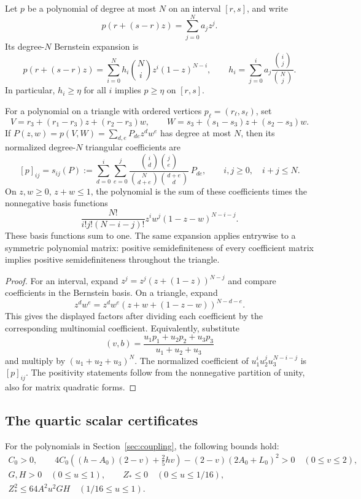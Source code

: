 \begin{lemma}\label{lem:bernstein-conversion}
Let $p$ be a polynomial of degree at most $N$ on an interval $[r,s]$,
and write
\[
 p(r+(s-r)z)=\sum_{j=0}^N a_jz^j.
\]
Its degree-$N$ Bernstein expansion is
\[
 p(r+(s-r)z)=\sum_{i=0}^N h_i\binom Ni z^i(1-z)^{N-i},
 \qquad
 h_i=\sum_{j=0}^i a_j\frac{\binom ij}{\binom Nj}.
\]
In particular, $h_i\ge\eta$ for all $i$ implies $p\ge\eta$ on
$[r,s]$.

For a polynomial on a triangle with ordered vertices
$p_\ell=(r_\ell,s_\ell)$, set
\[
 V=r_3+(r_1-r_3)z+(r_2-r_3)w,\qquad
 W=s_3+(s_1-s_3)z+(s_2-s_3)w.
\]
If $P(z,w)=p(V,W)=\sum_{d,e}P_{de}z^dw^e$ has degree at most $N$,
then its normalized degree-$N$ triangular coefficients are
\[
 [p]_{ij}=s_{ij}(P):=
 \sum_{d=0}^i\sum_{e=0}^j
 \frac{\binom id\binom je}
      {\binom N{d+e}\binom{d+e}d}\,P_{de},
 \qquad i,j\ge0,\quad i+j\le N.
\]
On $z,w\ge0$, $z+w\le1$, the polynomial is the sum of these coefficients
times the nonnegative basis functions
\[
 \frac{N!}{i!j!(N-i-j)!}
       z^iw^j(1-z-w)^{N-i-j}.
\]
These basis functions sum to one. The same expansion applies entrywise
to a symmetric polynomial matrix: positive semidefiniteness of every
coefficient matrix implies positive semidefiniteness throughout the
triangle.
\end{lemma}

\begin{proof}
For an interval, expand
$z^j=z^j(z+(1-z))^{N-j}$ and compare coefficients in the Bernstein
basis. On a triangle, expand
\[
 z^dw^e=z^dw^e(z+w+(1-z-w))^{N-d-e}.
\]
This gives the displayed factors after dividing each coefficient by the
corresponding multinomial coefficient. Equivalently, substitute
\[
 (v,b)=\frac{u_1p_1+u_2p_2+u_3p_3}{u_1+u_2+u_3}
\]
and multiply by $(u_1+u_2+u_3)^N$. The normalized coefficient of
$u_1^iu_2^ju_3^{N-i-j}$ is $[p]_{ij}$. The positivity statements
follow from the nonnegative partition of unity, also for matrix
quadratic forms.
\end{proof}

\subsection{The quartic scalar certificates}

\begin{lemma}\label{lem:scalar-certificates}
For the polynomials in Section~\ref{sec:coupling}, the following bounds
hold:
\[
\begin{gathered}
 C_0>0,\qquad
 4C_0\left((h-A_0)(2-v)+\frac25hv\right)
       -(2-v)(2A_0+L_0)^2>0\quad(0\le v\le2),\\
 G,H>0\quad(0\le u\le1),\qquad
 Z_*\le0\quad(0\le u\le1/16),\\
 Z_*^2\le64A^2u^2GH\quad(1/16\le u\le1).
\end{gathered}
\]
\end{lemma}

